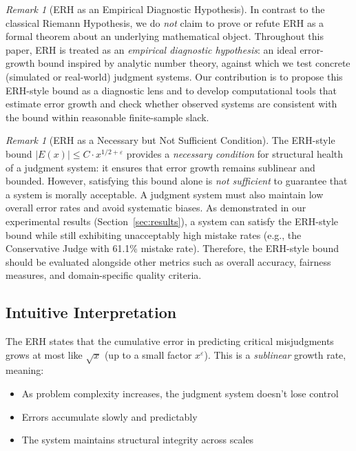 \documentclass[12pt,a4paper]{article}
\theoremstyle{definition}
\theoremstyle{remark}
\newtheorem{remark}[theorem]{Remark}
\begin{document}
\begin{remark}[ERH as an Empirical Diagnostic Hypothesis]
\label{rem:erh_empirical}
In contrast to the classical Riemann Hypothesis, we do \emph{not} claim to prove or refute ERH as a formal theorem about an underlying mathematical object. Throughout this paper, ERH is treated as an \emph{empirical diagnostic hypothesis}: an ideal error-growth bound inspired by analytic number theory, against which we test concrete (simulated or real-world) judgment systems. Our contribution is to propose this ERH-style bound as a diagnostic lens and to develop computational tools that estimate error growth and check whether observed systems are consistent with the bound within reasonable finite-sample slack.
\end{remark}

\begin{remark}[ERH as a Necessary but Not Sufficient Condition]
\label{rem:erh_necessary}
The ERH-style bound $|E(x)| \leq C \cdot x^{1/2 + \varepsilon}$ provides a \emph{necessary condition} for structural health of a judgment system: it ensures that error growth remains sublinear and bounded. However, satisfying this bound alone is \emph{not sufficient} to guarantee that a system is morally acceptable. A judgment system must also maintain low overall error rates and avoid systematic biases. As demonstrated in our experimental results (Section~\ref{sec:results}), a system can satisfy the ERH-style bound while still exhibiting unacceptably high mistake rates (e.g., the Conservative Judge with 61.1\% mistake rate). Therefore, the ERH-style bound should be evaluated alongside other metrics such as overall accuracy, fairness measures, and domain-specific quality criteria.
\end{remark}

\subsection{Intuitive Interpretation}

The ERH states that the cumulative error in predicting critical misjudgments grows at most like $\sqrt{x}$ (up to a small factor $x^\varepsilon$). This is a \emph{sublinear} growth rate, meaning:

\begin{itemize}
    \item As problem complexity increases, the judgment system doesn't lose control
    \item Errors accumulate slowly and predictably
    \item The system maintains structural integrity across scales
\end{itemize}
\end{document}
